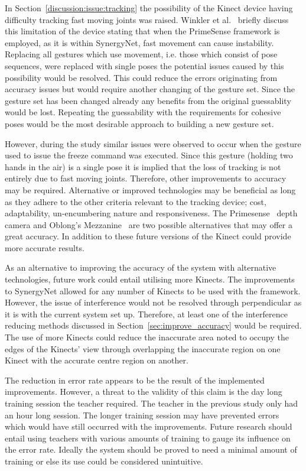 \documentclass[manuscript, review, screen]{acmart}
\begin{document}
In Section~\ref{discussion:issue:tracking} the possibility of the Kinect device having difficulty tracking fast moving joints was raised.
Winkler et al.~\cite{Winkler2012} briefly discuss this limitation of the device stating that when the PrimeSense framework is employed, as it is within SynergyNet, fast movement can cause instability.
Replacing all gestures which use movement, i.e. those which consist of pose sequences, were replaced with single poses the potential issues caused by this possibility would be resolved.
This could reduce the errors originating from accuracy issues but would require another changing of the gesture set.
Since the gesture set has been changed already any benefits from the original guessablity would be lost.
Repeating the guessability with the requirements for cohesive poses would be the most desirable approach to building a new gesture set.

However, during the study similar issues were observed to occur when the gesture used to issue the freeze command was executed.
Since this gesture (holding two hands in the air) is a single pose it is implied that the loss of tracking is not entirely due to fast moving joints.
Therefore, other improvements to accuracy may be required.
Alternative or improved technologies may be beneficial as long as they adhere to the other criteria relevant to the tracking device; cost, adaptability, un-encumbering nature and responsiveness.
The Primesense~\cite{Wilson2010} depth camera and Oblong's Mezzanine~\cite{kramer2011} are two possible alternatives that may offer a great accuracy.
In addition to these future versions of the Kinect could provide more accurate results.

As an alternative to improving the accuracy of the system with alternative technologies, future work could entail utilising more Kinects.
The improvements to SynergyNet allowed for any number of Kinects to be used with the framework.
However, the issue of interference would not be resolved through perpendicular as it is with the current system set up.
Therefore, at least one of the interference reducing methods discussed in Section~\ref{sec:improve_accuracy} would be required.
The use of more Kinects could reduce the inaccurate area noted to occupy the edges of the Kinects' view through overlapping the inaccurate region on one Kinect with the accurate centre region on another.

The reduction in error rate appears to be the result of the implemented improvements.
However, a threat to the validity of this claim is the day long training session the teacher required.
The teacher in the previous study only had an hour long session.
The longer training session may have prevented errors which would have still occurred with the improvements.
Future research should entail using teachers with various amounts of training to gauge its influence on the error rate.
Ideally the system should be proved to need a minimal amount of training or else its use could be considered unintuitive.
\end{document}
